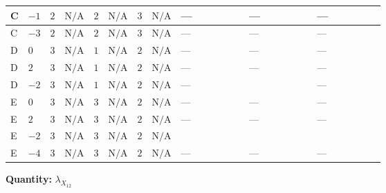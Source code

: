 \documentclass[8pt]{article}
\begin{document}
\begin{landscape}
\begin{longtable}{@{}llcccccc >{\raggedright\arraybackslash}p{0.21\linewidth} >{\raggedright\arraybackslash}p{0.21\linewidth} >{\raggedright\arraybackslash}p{0.21\linewidth}@{}}
\midrule
C & $-1$ & $2$ & $\text{N/A}$ & $2$ & $\text{N/A}$ & $3$ & $\text{N/A}$ & --- & --- & --- \\
\midrule
C & $-3$ & $2$ & $\text{N/A}$ & $2$ & $\text{N/A}$ & $3$ & $\text{N/A}$ & --- & --- & --- \\
\midrule
D & $0$ & $3$ & $\text{N/A}$ & $1$ & $\text{N/A}$ & $2$ & $\text{N/A}$ & --- & --- & --- \\
\midrule
D & $2$ & $3$ & $\text{N/A}$ & $1$ & $\text{N/A}$ & $2$ & $\text{N/A}$ & --- & --- & --- \\
\midrule
D & $-2$ & $3$ & $\text{N/A}$ & $1$ & $\text{N/A}$ & $2$ & $\text{N/A}$ & --- & \scriptsize\adjustbox{max width=\linewidth}{$\begin{gathered} -4 {\lambda_{HS_1}^{(A)}} {\lambda_{X_{12}}}\end{gathered}$} & --- \\
\midrule
E & $0$ & $3$ & $\text{N/A}$ & $3$ & $\text{N/A}$ & $2$ & $\text{N/A}$ & --- & --- & --- \\
\midrule
E & $2$ & $3$ & $\text{N/A}$ & $3$ & $\text{N/A}$ & $2$ & $\text{N/A}$ & --- & --- & --- \\
\midrule
E & $-2$ & $3$ & $\text{N/A}$ & $3$ & $\text{N/A}$ & $2$ & $\text{N/A}$ & \scriptsize\adjustbox{max width=\linewidth}{$\begin{gathered} -2 {\lambda_{HS_2}^{(A)}} {\lambda_{X_{12}}}\end{gathered}$} & \scriptsize\adjustbox{max width=\linewidth}{$\begin{gathered} -2 {\lambda_{HS_1}^{(A)}} {\lambda_{X_{12}}}\end{gathered}$} & \scriptsize\adjustbox{max width=\linewidth}{$\begin{gathered} -2 {\lambda_{12}^{(A)}} {\lambda_{X_{12}}}\end{gathered}$} \\
\midrule
E & $-4$ & $3$ & $\text{N/A}$ & $3$ & $\text{N/A}$ & $2$ & $\text{N/A}$ & --- & --- & --- \\
\midrule
\bottomrule
\end{longtable}
\clearpage
\noindent\textbf{Quantity: }${\lambda_{X_{12}}}$\par\smallskip

\end{landscape}
\end{document}
